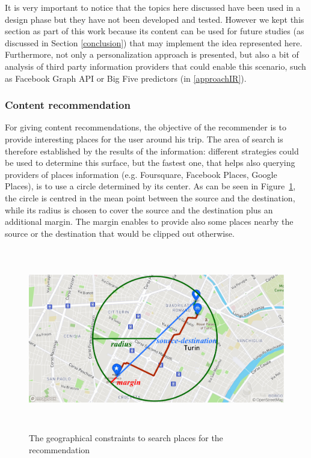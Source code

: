 It is very important to notice that the topics here discussed have been used in a design phase but they have not been developed and tested. However we kept this section as part of this work because its content can be used for future studies (as discussed in Section \ref{conclusion}) that may implement the idea represented here. Furthermore, not only a personalization approach is presented, but also a bit of analysis of third party information providers that could enable this scenario, such as Facebook Graph API or Big Five predictors (in \ref{approachIR}).

\subsubsection{Content recommendation}
\label{approachRec}

For giving content recommendations, the objective of the recommender is to provide interesting places for the user around his trip. The area of search is therefore established by the results of the information: different strategies could be used to determine this surface, but the fastest one, that helps also querying providers of places information (e.g. Foursquare, Facebook Places, Google Places), is to use a circle determined by its center. As can be seen in Figure~\ref{fig:placesSearch}, the circle is centred in the mean point between the source and the destination, while its radius is chosen to cover the source and the destination plus an additional margin. The margin enables to provide also some places nearby the source or the destination that would be clipped out otherwise.

\begin{figure}[!htbp]
    \centering
    \includegraphics[max width=\linewidth,max height=8cm,keepaspectratio]{figures/placesSearch}
    \caption{The geographical constraints to search places for the recommendation}\label{fig:placesSearch}
\end{figure}


